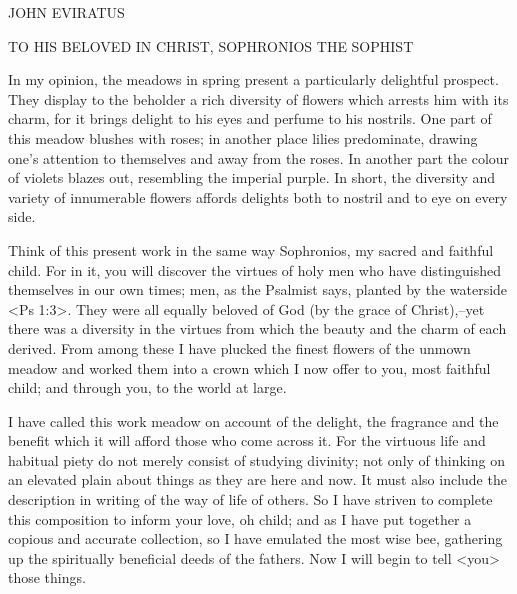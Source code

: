 JOHN EVIRATUS

TO HIS BELOVED IN CHRIST,
SOPHRONIOS THE SOPHIST

In my opinion, the meadows in spring present a particularly delightful prospect.
They display to the beholder a rich diversity of flowers which arrests him with its charm, for it brings delight to his eyes and perfume to his nostrils.
One part of this meadow blushes with roses; in another place lilies predominate, drawing one's attention to themselves and away from the roses.
In another part the colour of violets blazes out, resembling the imperial purple.
In short, the diversity and variety of innumerable flowers affords
delights both to nostril and to eye on every side.

Think of this present work in the same way Sophronios, my sacred and faithful child.
For in it, you will discover the virtues of holy men who have distinguished themselves in our own times;
men, as the Psalmist says, planted by the waterside <Ps 1:3>.
They were all equally beloved of God (by the grace of Christ),--yet there was a diversity in the virtues from which the beauty and the charm of each derived.
From among these I have plucked the finest flowers of the unmown meadow and worked them into a crown which I now offer to you, most faithful child; and through you, to the world at large.

I have called this work meadow on account of the delight, the fragrance and the benefit which it will afford those who come across
it.
For the virtuous life and habitual piety do not merely consist of
studying divinity; not only of thinking on an elevated plain about
things as they are here and now.
It must also include the description in writing of the way of life of others.
So I have striven to complete this composition to inform your love, oh child;
and as I have put together a copious and accurate collection, so I have emulated the most wise bee, gathering up the spiritually beneficial deeds of the fathers.
Now I will begin to tell <you> those things.
